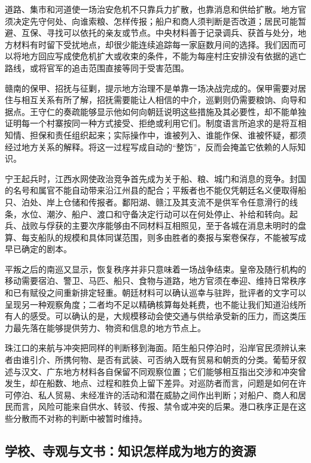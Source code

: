 道路、集市和河道使一场治安危机不只靠兵力扩散，也靠消息和供给扩散。地方官须决定先守何处、向谁索粮、怎样传报；船户和商人须判断是否改道；居民可能暂避、互保、寻找可以依托的亲友或节点。中央材料善于记录调兵、获首与处分，地方材料有时留下受扰地点，却很少能连续追踪每一家庭数月间的选择。我们因而可以将地方回应写成使危机扩大或收束的条件，不能为每座村庄安排没有依据的逃亡路线，或将官军的追击范围直接等同于受害范围。

赣南的保甲、招抚与征剿，提示地方治理不是单靠一场决战完成的。保甲需要对居住与相互关系有所了解，招抚需要能让人相信的中介，巡剿则仍需要粮饷、向导和据点。王守仁的奏疏能够显示他如何向朝廷说明这些措施及其必要性，却不能单独证明每一个村寨按同一种方式接受、拒绝或利用它们。制度语言所追求的是将互相知情、担保和责任组织起来；实际操作中，谁被列入、谁能作保、谁被怀疑，都须经过地方关系的解释。将这一过程写成自动的“整饬”，反而会掩盖它依赖的人际知识。

宁王起兵时，江西水网使政治竞争首先成为关于船、粮、城门和消息的竞争。封国的名号和属官不能自动带来沿江州县的配合；平叛者也不能仅凭朝廷名义便取得船只、泊处、岸上仓储和传报者。鄱阳湖、赣江及其支流不是供军令任意滑行的线条，水位、潮汐、船户、渡口和守备决定行动可以在何处停止、补给和转向。起兵、战败与俘获的主要次序能够由不同材料互相照见，至于各城在消息未明时的盘算、每支船队的规模和具体同谋范围，则多由胜者的奏报与案卷保存，不能被写成早已确定的剧本。

平叛之后的南巡又显示，恢复秩序并非只意味着一场战争结束。皇帝及随行机构的移动需要宿泊、警卫、马匹、船只、食物与道路，地方官须在奉迎、维持日常秩序和已有赋役之间重新排定轻重。朝廷材料可以确认巡幸与驻跸，批评者的文字可以呈现另一种观察角度；二者均不足以精确核算每处耗费，也不能让我们知道沿线所有人的感受。可以确认的是，大规模移动会使交通与供给承受新的压力，而这类压力最先落在能够提供劳力、物资和信息的地方节点上。

珠江口的来航与冲突把同样的判断移到海面。陌生船只停泊时，沿岸官民须辨认来者由谁引介、所携何物、是否有武装、可否纳入既有贸易和朝贡的分类。葡萄牙叙述与汉文、广东地方材料各自保留不同观察位置；它们能够相互指出交涉和冲突曾发生，却在船数、地点、过程和胜负上留下差异。对巡防者而言，问题是如何在许可停泊、私人贸易、未经准许的活动和潜在威胁之间作出判断；对船户、商人和居民而言，风险可能来自供水、转驳、传报、禁令或冲突的后果。港口秩序正是在这些分散而不对称的判断中被暂时维持。

\subsection{学校、寺观与文书：知识怎样成为地方的资源}

